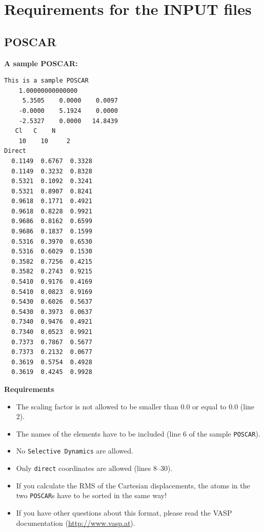 \documentclass[12pt,a4paper]{article}
\begin{document}
  


\newpage
 \section{Requirements for the INPUT files}
 
 \subsection{POSCAR}\label{POSCAR}
 
\textbf{A sample POSCAR:}
\begin{lstlisting}[frame=single] 
 This is a sample POSCAR
    1.00000000000000
     5.3505    0.0000    0.0097
    -0.0000    5.1924    0.0000
    -2.5327    0.0000   14.8439
   Cl   C    N
    10    10     2
Direct
  0.1149  0.6767  0.3328
  0.1149  0.3232  0.8328
  0.5321  0.1092  0.3241
  0.5321  0.8907  0.8241
  0.9618  0.1771  0.4921
  0.9618  0.8228  0.9921
  0.9686  0.8162  0.6599
  0.9686  0.1837  0.1599
  0.5316  0.3970  0.6530
  0.5316  0.6029  0.1530
  0.3582  0.7256  0.4215
  0.3582  0.2743  0.9215
  0.5410  0.9176  0.4169
  0.5410  0.0823  0.9169
  0.5430  0.6026  0.5637
  0.5430  0.3973  0.0637
  0.7340  0.9476  0.4921
  0.7340  0.0523  0.9921
  0.7373  0.7867  0.5677
  0.7373  0.2132  0.0677
  0.3619  0.5754  0.4928
  0.3619  0.4245  0.9928
\end{lstlisting}
\textbf{Requirements}
\begin{itemize}
  \item The scaling factor is not allowed to be smaller than 0.0 or equal to 0.0 (line 2).
  \item The names of the elements have to be included (line 6 of the sample \texttt{POSCAR}).
  \item No \texttt{Selective Dynamics} are allowed.
  \item Only \texttt{direct} coordinates are allowed (lines 8--30).
  \item If you calculate the RMS of the Cartesian displacements, the atoms in the two \texttt{POSCAR}s have to be sorted in the same way!
  \item If you have other questions about this format, please read the VASP documentation (\url{http://www.vasp.at}).
 \end{itemize}
 
  \newpage
\end{document}
